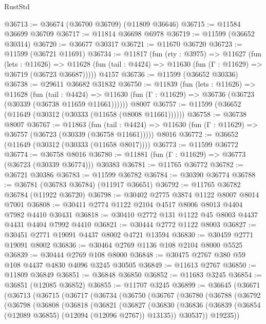 \begin{lexlean}{RustStd}
\begin{coremodule}
@36713 := @36674 (@36700 @36709) (@11809 @36646)
@36715 := @11584 @36699 @36709
@36717 := @11814 @36698 @6978
@36719 := @11599 (@36652 @30314)
@36720 := @36677 @30317
@36721 := @11670 @36720
@36723 := @11599 (@36721 @11691)
@36734 := @11817
    (fun (rty : @3975) =>
    @11627
      (fun (lets : @11626) =>
      @11628 (fun (tail : @4424) => @11630 (fun (Γ : @11629) => @36719 (@36723 @36687)))))
    @4157
@36736 := @11599 (@36652 @30336)
@36738 := @29611 @36682 @31832
@36750 := @11839
    (fun (lets : @11626) =>
    @11628
      (fun (tail : @4424) =>
      @11630 (fun (Γ : @11629) => @36736 (@36723 (@30339 (@36738 @11659 @11661))))))
    @8007
@36757 := @11599 (@36652 (@11649 (@30312 (@30333 (@11658 (@8008 @11661))))))
@36758 := @36738 @8007
@36767 := @11863
    (fun (tail : @4424) => @11630 (fun (Γ : @11629) => @36757 (@36723 (@30339 (@36758 @11661)))))
    @8016
@36772 := @36652 (@11649 (@30312 (@30333 (@11658 @8017))))
@36773 := @11599 @36772
@36774 := @36758 @8016
@36780 := @11881 (fun (Γ : @11629) => @36773 (@36723 (@30339 @36774))) @30383
@36781 := @11765 @36772
@36782 := @36721 @30386
@36783 := @11599 @36782
@36784 := @30390 @36774
@36788 := @36781 (@36783 @36784) (@11917 @36651)
@36792 := @11765 @36782 @36784 (@11922 @36720)
@36798 := @30402 @2775 @3874 @1122 @8007 @8014 @7001
@36808 := @30411 @2774 @1122 @2104 @4517 @8006 @8013 @4404 @7982 @4410 @30431
@36818 := @30410 @2772 @131 @1122 @45 @8003 @4437 @4431 @4404 @7992 @4410
@36821 := @30444 @2772 @1122 @8003
@36827 := @30451 @2771 @19091 @4437 @8002 @4721 @13594
@36830 := @30459 @2771 @19091 @8002
@36836 := @30464 @2769 @1136 @108 @2104 @8000 @5525
@36839 := @30444 @2769 @108 @8000
@36848 := @30475 @2767 @380 @59 @108 @4437 @4830 @4096 @3245 @30505
@36849 := @11613 @2767
@36850 := @11809 @36849
@36851 := @36848 @36850
@36852 := @11683 @3245
@36854 := @36851 (@12085 @36852)
@36855 := @11707 @3245
@36899 := @36645
    (@36671
      (@36713
        (@36715
          (@36717
            (@36734
              (@36750
                (@36767
                  (@36780
                    (@36788
                      (@36792
                        (@36798
                          (@36808
                            (@36818
                              (@36821
                                (@36827
                                  (@36830
                                    (@36836
                                      (@36839
                                        (@36854 (@12089 @36855) (@12094 (@12096 @2767)) @13135))
                                      @30537))
                                  @19235))

\end{coremodule}
\end{lexlean}

